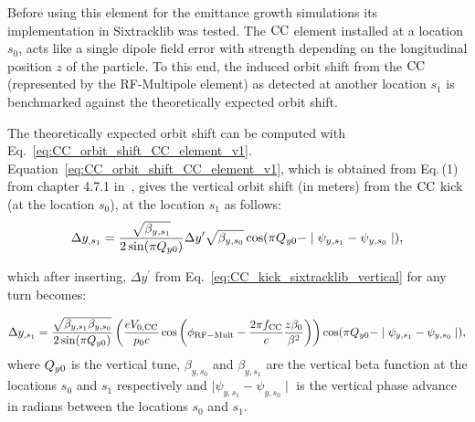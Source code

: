 Before using this element for the emittance growth simulations its implementation in Sixtracklib was tested. %
The ${\mathrm{CC}}$ element installed at a location $s_0$, acts like a single dipole field error with strength depending on the longitudinal position $z$ of the particle. To this end, the induced orbit shift from the ${\mathrm{CC}}$ (represented by the RF-Multipole element) as detected at another location $s_1$ is benchmarked against the theoretically expected orbit shift. %

The theoretically expected orbit shift can be computed with Eq.~\eqref{eq:CC_orbit_shift_CC_element_v1}. Equation~\eqref{eq:CC_orbit_shift_CC_element_v1}, which is obtained from Eq.\,(1) from chapter 4.7.1 in~\cite{Chao:1490001}, gives the vertical orbit shift (in meters) from the ${\mathrm{CC}}$ kick (at the location $s_0$), at the location $s_1$ as follows:
\begin{equation}\label{eq:CC_orbit_shift_CC_element_v1}
    \Delta y_{,s_1} = \frac{\sqrt{\beta_{y, s_1}}}{2 \sin(\pi {Q_{y0}})} \Delta y^\prime \sqrt{\beta_{y, s_0}} \cos(\pi {Q_{y0}} - \mid \psi_{y, s_1} - \psi_{y, s_0} \mid),
 \end{equation}

which after inserting, $\Delta y^\prime$ from Eq.~\eqref{eq:CC_kick_sixtracklib_vertical} for any turn becomes:

\begin{equation}\label{eq:CC_orbit_shift_CC_element}
    \Delta y_{,s_1} = \frac{\sqrt{\beta_{y, s_1} \beta_{y, s_0} }}{2 \sin(\pi {Q_{y0}})} \left ( \frac{e V_\mathrm{0,CC}}{p_0 c} \cos{\left ( \phi_\mathrm{RF-Mult} - \frac{2\pi f_\mathrm{CC}}{c} \frac{z \beta_0}{\beta^2} \right )} \right ) \cos(\pi {Q_{y0}} - \mid \psi_{y, s_1} - \psi_{y, s_0} \mid),
\end{equation}
where ${Q_{y0}}$ is the vertical tune, $\beta_{y, s_0}$ and $\beta_{y, s_1}$ are the vertical beta function at the locations $s_0$ and $s_1$ respectively and $\mid \psi_{y, s_1} - \psi_{y, s_0} \mid$ is the vertical phase advance in radians between the locations $s_0$ and $s_1$.


